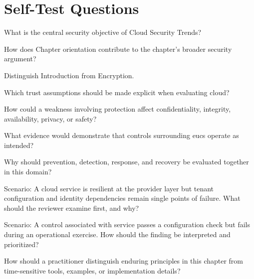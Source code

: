\documentclass[11pt,letterpaper]{article}
\begin{document}
\section*{Self-Test Questions}
\begin{CornellRecallList}
\item What is the central security objective of Cloud Security Trends?
\item How does Chapter orientation contribute to the chapter's broader security argument?
\item Distinguish Introduction from Encryption.
\item Which trust assumptions should be made explicit when evaluating cloud?
\item How could a weakness involving protection affect confidentiality, integrity, availability, privacy, or safety?
\item What evidence would demonstrate that controls surrounding eucs operate as intended?
\item Why should prevention, detection, response, and recovery be evaluated together in this domain?
\item Scenario: A cloud service is resilient at the provider layer but tenant configuration and identity dependencies remain single points of failure. What should the reviewer examine first, and why?
\item Scenario: A control associated with service passes a configuration check but fails during an operational exercise. How should the finding be interpreted and prioritized?
\item How should a practitioner distinguish enduring principles in this chapter from time-sensitive tools, examples, or implementation details?
\end{CornellRecallList}
\end{document}

